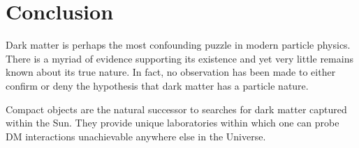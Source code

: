 
\chapter{Conclusion}
\label{chapter:conclusion}

  

Dark matter is perhaps the most confounding puzzle in modern particle physics. There is a myriad of evidence supporting its existence and yet very little remains known about its true nature. In fact, no observation has been made to either confirm or deny the hypothesis that dark matter has a particle nature. 



Compact objects are the natural successor to searches for dark matter captured within the Sun. They provide unique laboratories within which one can probe DM interactions unachievable anywhere else in the Universe. 